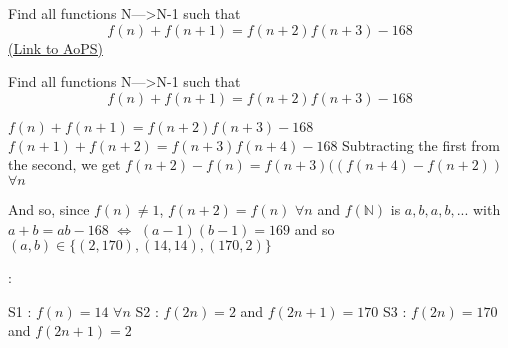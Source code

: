 \begin{problem}
	Find all functions N--->N-{1} such that 
\[f(n) +f(n+1)=f(n+2)f(n+3)-168\]
	\flushright \href{https://artofproblemsolving.com/community/c6h570003}{(Link to AoPS)}
\end{problem}



\begin{solution}
	\begin{tcolorbox}Find all functions N--->N-{1} such that 
\[f(n) +f(n+1)=f(n+2)f(n+3)-168\]\end{tcolorbox}
$f(n)+f(n+1)=f(n+2)f(n+3)-168$
$f(n+1)+f(n+2)=f(n+3)f(n+4)-168$
Subtracting the first from the second, we get $f(n+2)-f(n)=f(n+3)((f(n+4)-f(n+2))$ $\forall n$

And so, since $f(n)\ne 1$, $f(n+2)=f(n)$ $\forall n$ and $f(\mathbb N)$ is $a,b,a,b,...$ with $a+b=ab-168$
$\iff$ $(a-1)(b-1)=169$ and so $(a,b)\in\{(2,170),(14,14),(170,2)\}$

 :

S1 : $f(n)=14$ $\forall n$
S2 : $f(2n)=2$ and $f(2n+1)=170$
S3 : $f(2n)=170$ and $f(2n+1)=2$
\end{solution}






